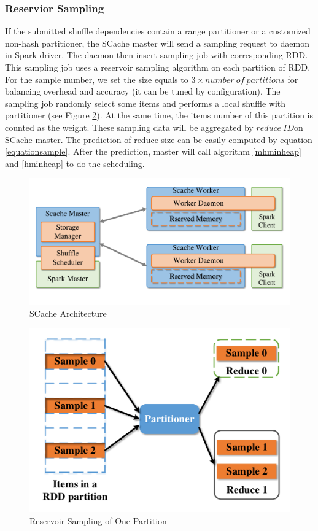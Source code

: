 \subsubsection{Reservior Sampling}\label{sampling}
If the submitted shuffle dependencies contain a range partitioner or a customized non-hash partitioner, the SCache master will send a sampling request to daemon in Spark driver. The daemon then insert sampling job with corresponding RDD. This sampling job uses a reservoir sampling algorithm \cite{reservoir} on each partition of RDD. For the sample number, we set the size equals to $3 \times number\ of\ partitions$ for balancing overhead and accuracy (it can be tuned by configuration). The sampling job randomly select some items and performs a local shuffle with partitioner (see Figure \ref{fig:sample}). At the same time, the items number of this partition is counted as the weight. These sampling data will be aggregated by $reduce\ ID$on SCache master. The prediction of reduce size can be easily computed by equation \ref{equationsample}. After the prediction, master will call algorithm \ref{mhminheap} and \ref{hminheap} to do the scheduling. 

\begin{figure}
	\centering
	\includegraphics[width=0.9\linewidth]{fig/arch}
	\caption{SCache Architecture}
	\label{fig:arch}
\end{figure}
\begin{figure}
	\centering
	\includegraphics[width=0.7\linewidth]{fig/sample}
	\caption{Reservoir Sampling of One Partition}
	\label{fig:sample}
\end{figure}

